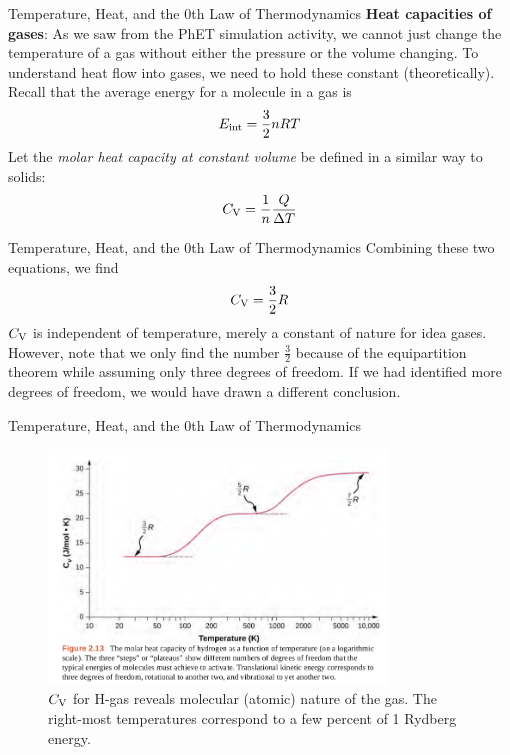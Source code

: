 \documentclass{beamer}
\begin{document}
\begin{frame}{Temperature, Heat, and the 0th Law of Thermodynamics}
\textbf{Heat capacities of gases}: As we saw from the PhET simulation activity, we cannot just change the temperature of a gas without either the pressure or the volume changing.  To understand heat flow into gases, we need to hold these constant (theoretically).  Recall that the average energy for a molecule in a gas is 
\begin{equation}
E_{\rm int} = \frac{3}{2}nRT
\end{equation}
Let the \textit{molar heat capacity at constant volume} be defined in a similar way to solids:
\begin{equation}
C_{\rm V} = \frac{1}{n}\frac{Q}{\Delta T}
\end{equation}
\end{frame}

\begin{frame}{Temperature, Heat, and the 0th Law of Thermodynamics}
Combining these two equations, we find  
\begin{equation}
C_{\rm V} = \frac{3}{2}R
\end{equation}
$C_{\rm V}$ is independent of temperature, merely a constant of nature for idea gases. However, note that we only find the number $\frac{3}{2}$ because of the equipartition theorem while assuming only three degrees of freedom.  If we had identified more degrees of freedom, we would have drawn a different conclusion.
\end{frame}

\begin{frame}{Temperature, Heat, and the 0th Law of Thermodynamics}
\small
\begin{figure}
\centering
\includegraphics[width=0.8\textwidth]{figures/cv.png}
\caption{\label{fig:cv} $C_{\rm V}$ for H-gas reveals molecular (atomic) nature of the gas.  The right-most temperatures correspond to a few percent of 1 Rydberg energy.}
\end{figure}
\end{frame}
\end{document}
